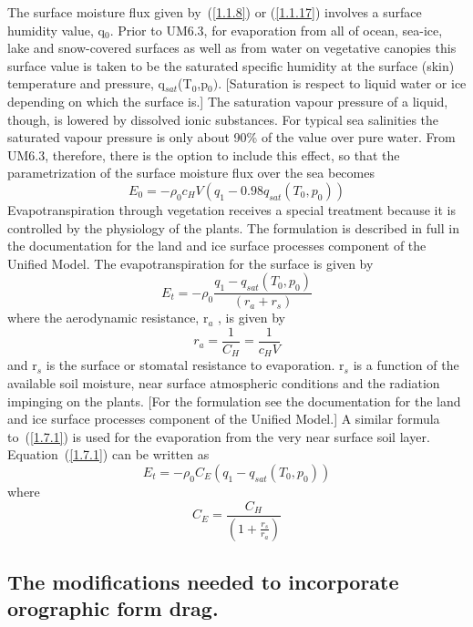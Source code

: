 \documentclass{UMDP_article}
\begin{document}
The surface moisture flux given by~(\ref{1.1.8}) or (\ref{1.1.17})
involves a surface humidity value, q$_{0}$. Prior to UM6.3, for
evaporation from all of ocean, sea-ice, lake and snow-covered surfaces
as well as from water on vegetative canopies this surface value is
taken to be the saturated specific humidity at the surface (skin)
temperature and pressure, q$_{sat}$(T$_{0}$,p$_{0})$. [Saturation is
respect to liquid water or ice depending on which the surface is.]
The saturation vapour pressure of a liquid, though, is lowered by
dissolved ionic substances.  For typical sea salinities the saturated
vapour pressure is only about 90\% of the value over pure water.  From
UM6.3, therefore, there is the option to include this effect, so that
the parametrization of the surface moisture flux over the sea becomes
\begin{equation*}
  E_0 = - \rho_0 c_H V (q_1 - 0.98 q_{sat}(T_0,p_0) )
\end{equation*}
Evapotranspiration through vegetation receives a special treatment
because it is controlled by the physiology of the plants. The
formulation is described in full in the documentation for the land and
ice surface processes component of the Unified Model. The
evapotranspiration for the surface is given by
\begin{equation}
  E_t = - \rho _0 \frac{ q_1 -  q_{sat} ( T_0 ,  p_0 )}{( r_a +  r_s )}
  \label{1.7.1}
\end{equation}
where the aerodynamic resistance, r$_{a}$ , is given by
\begin{equation}
  r_a = \frac{1}{ C_H } = \frac{1}{ c_H V}
  \label{1.7.2}
\end{equation}
and r$_{s}$ is the surface or stomatal resistance to
evaporation. r$_{s}$ is a function of the available soil moisture,
near surface atmospheric conditions and the radiation impinging on the
plants. [For the formulation see the documentation for the land and
ice surface processes component of the Unified Model.] A similar
formula to~(\ref{1.7.1}) is used for the evaporation from the very
near surface soil layer. Equation~(\ref{1.7.1}) can be written as
\begin{equation}
  E_t = - \rho _0  C_E ( q_1 -  q_{sat} ( T_0 ,  p_0 ) )
  \label{1.7.3}
\end{equation}
where
\begin{equation}
  C_E = \frac{ C_H }{\left( {1 + \frac{ r_s }{ r_a }} \right)}
  \label{1.7.4}
\end{equation}

\subsection{The modifications needed to incorporate orographic form
  drag.}
\label{section_2} 
\end{document}
